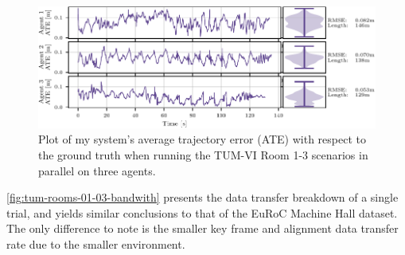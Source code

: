 \begin{figure}[h]
    \centering
    \includegraphics[width=0.9\linewidth]{figures/apr11_tum_room_trajectory_a_line_plot.pdf}

    \caption{Plot of my system's average trajectory error (ATE) with respect to the ground truth when running the TUM-VI Room 1-3 scenarios in parallel on three agents.}
    \label{fig:tum-room-01-03-line-plot}
\end{figure}

\autoref{fig:tum-rooms-01-03-bandwith} presents the data transfer breakdown of a single trial, and yields similar conclusions to that of the EuRoC Machine Hall dataset. The only difference to note is the smaller key frame and alignment data transfer rate due to the smaller environment.

